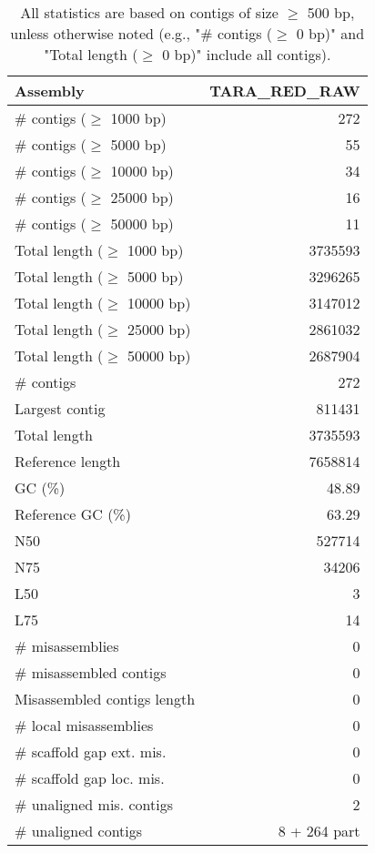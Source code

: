 \documentclass[12pt,a4paper]{article}
\begin{document}
\begin{table}[ht]
\begin{center}
\caption{All statistics are based on contigs of size $\geq$ 500 bp, unless otherwise noted (e.g., "\# contigs ($\geq$ 0 bp)" and "Total length ($\geq$ 0 bp)" include all contigs).}
\begin{tabular}{|l*{1}{|r}|}
\hline
Assembly & TARA\_RED\_RAW \\ \hline
\# contigs ($\geq$ 1000 bp) & 272 \\ \hline
\# contigs ($\geq$ 5000 bp) & 55 \\ \hline
\# contigs ($\geq$ 10000 bp) & 34 \\ \hline
\# contigs ($\geq$ 25000 bp) & 16 \\ \hline
\# contigs ($\geq$ 50000 bp) & 11 \\ \hline
Total length ($\geq$ 1000 bp) & 3735593 \\ \hline
Total length ($\geq$ 5000 bp) & 3296265 \\ \hline
Total length ($\geq$ 10000 bp) & 3147012 \\ \hline
Total length ($\geq$ 25000 bp) & 2861032 \\ \hline
Total length ($\geq$ 50000 bp) & 2687904 \\ \hline
\# contigs & 272 \\ \hline
Largest contig & 811431 \\ \hline
Total length & 3735593 \\ \hline
Reference length & 7658814 \\ \hline
GC (\%) & 48.89 \\ \hline
Reference GC (\%) & 63.29 \\ \hline
N50 & 527714 \\ \hline
N75 & 34206 \\ \hline
L50 & 3 \\ \hline
L75 & 14 \\ \hline
\# misassemblies & 0 \\ \hline
\# misassembled contigs & 0 \\ \hline
Misassembled contigs length & 0 \\ \hline
\# local misassemblies & 0 \\ \hline
\# scaffold gap ext. mis. & 0 \\ \hline
\# scaffold gap loc. mis. & 0 \\ \hline
\# unaligned mis. contigs & 2 \\ \hline
\# unaligned contigs & 8 + 264 part \\ \hline

\end{tabular}
\end{center}
\end{table}
\end{document}
